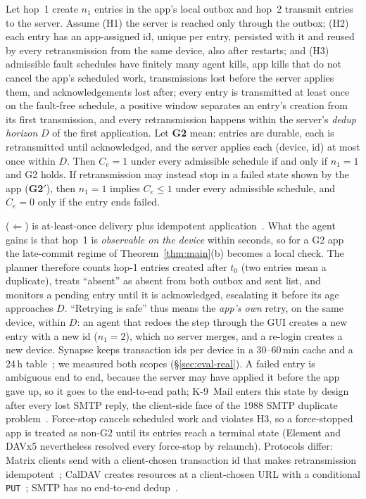 \begin{theorem}
\label{thm:twohop}
Let hop~1 create $n_1$ entries in the app's local outbox and hop~2 transmit entries to the server. Assume (H1) the server is reached only through the outbox; (H2) each entry
has an app-assigned id, unique per entry, persisted with it and reused by every retransmission from the same device, also after restarts; and (H3) admissible fault schedules
have finitely many agent kills, app kills that do not cancel the app's scheduled work, transmissions lost before the server applies them, and acknowledgements lost after;
every entry is transmitted at least once on the fault-free schedule, a positive window separates an entry's creation from its first transmission, and every retransmission
happens within the server's \emph{dedup horizon} $D$ of the first application.
Let \textbf{G2} mean: entries are durable, each is retransmitted until acknowledged, and the server applies each (device, id) at most once within $D$. Then $C_e=1$ under every admissible
schedule if and only if $n_1=1$ and G2 holds. If retransmission may instead stop in a failed state shown by the app (\textbf{G2$'$}), then $n_1=1$ implies $C_e\le1$ under
every admissible schedule, and $C_e=0$ only if the entry ends failed.
\end{theorem}
($\Leftarrow$) is at-least-once delivery plus idempotent application~\cite{helland2012idempotence,birrell1984rpc,wang2021kafka}. What the agent gains is that hop~1 is
\emph{observable on the device} within seconds, so for a G2 app the late-commit regime of Theorem~\ref{thm:main}(b) becomes a local check. The planner therefore counts hop-1
entries created after $t_0$ (two entries mean a duplicate), treats ``absent'' as absent from both outbox and sent list, and monitors a pending entry until it is acknowledged,
escalating it before its age approaches $D$. ``Retrying is safe'' thus means the \emph{app's own} retry, on the same device, within $D$: an agent that redoes the step
through the GUI creates a new entry with a new id ($n_1{=}2$), which no server merges, and a re-login creates a new device. Synapse keeps transaction ids per device in a
30--60\,min cache and a 24\,h table~\cite{synapse_txn,matrix_spec}; we measured both scopes (\S\ref{sec:eval-real}). A failed entry is ambiguous end to end, because the server
may have applied it before the app gave up, so it goes to the end-to-end path; K-9~Mail enters this state by design after every lost SMTP reply, the client-side face of
the 1988 SMTP duplicate problem~\cite{rfc1047}. Force-stop cancels scheduled work and violates H3, so a force-stopped app is treated as non-G2 until its entries reach a
terminal state (Element and DAVx5 nevertheless resolved every force-stop by relaunch). Protocols differ: Matrix clients send with a client-chosen transaction id that makes
retransmission idempotent~\cite{matrix_spec}; CalDAV creates resources at a client-chosen URL with a conditional \texttt{PUT}~\cite{rfc4791,rfc9110}; SMTP has no end-to-end
dedup~\cite{rfc5321}.

